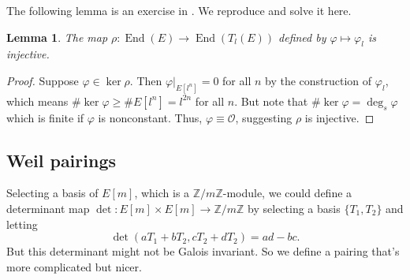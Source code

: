 \documentclass[12pt]{article}
\newtheorem{lemma}{Lemma}[subsection]
\theoremstyle{remark}
\theoremstyle{definition}
\newcommand{\Z}[0]{\mathbb{Z}}
\newcommand{\ecO}[0]{\mathcal O}
\newcommand{\End}[0]{\operatorname{End}}
\begin{document}
            The following lemma is an exercise in \cite{silverman_2009_the}. We reproduce and solve it here.
            \begin{lemma}\label{lemma-tate-map-inj}
                The map $\rho:\End(E)\to\End(T_l(E))$ defined by $\varphi\mapsto\varphi_l$ is injective.
            \end{lemma}
            \begin{proof}
                Suppose $\varphi\in\ker\rho$. Then $\left.\varphi\right|_{E[l^n]}=0$ for all $n$ by the construction of $\varphi_l$, which means $\#\ker\varphi\geqslant\#E[l^n]=l^{2n}$ for all $n$. But note that $\#\ker\varphi=\deg_s\varphi$ which is finite if $\varphi$ is nonconstant. Thus, $\varphi\equiv\ecO$, suggesting $\rho$ is injective.
            \end{proof}
            
        
        \subsection{Weil pairings}
            Selecting a basis of $E[m]$, which is a $\Z/m\Z$-module, we could define a determinant map $\det:E[m]\times E[m]\to\Z/m\Z$ by selecting a basis $\{T_1,T_2\}$ and letting
            \[\det(aT_1+bT_2, cT_2+dT_2)=ad-bc.\]
            But this determinant might not be Galois invariant. So we define a pairing that's more complicated but nicer.
            
\end{document}
